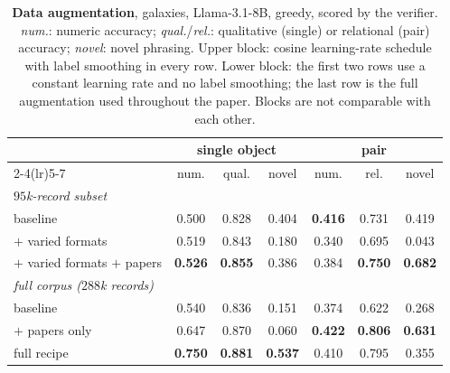 \begin{table}[h]\centering\small
\caption{\textbf{Data augmentation}, galaxies, Llama-3.1-8B, greedy, scored by the
verifier. \emph{num.}: numeric accuracy; \emph{qual.}/\emph{rel.}: qualitative
(single) or relational (pair) accuracy; \emph{novel}: novel phrasing. Upper
block: cosine learning-rate schedule with label smoothing in every row. Lower
block: the first two rows use a constant learning rate and no label smoothing;
the last row is the full augmentation used throughout the paper. Blocks are not
comparable with each other.}
\label{tab:recipe}
\begin{tabular}{lcccccc}
\toprule
 & \multicolumn{3}{c}{single object} & \multicolumn{3}{c}{pair} \\
\cmidrule(lr){2-4}\cmidrule(lr){5-7}
 & num. & qual. & novel & num. & rel. & novel \\
\midrule
\multicolumn{7}{l}{\emph{$95$k-record subset}}\\
baseline                         & 0.500 & 0.828 & 0.404 & \textbf{0.416} & 0.731 & 0.419 \\
$+$ varied formats               & 0.519 & 0.843 & 0.180 & 0.340 & 0.695 & 0.043 \\
$+$ varied formats $+$ papers    & \textbf{0.526} & \textbf{0.855} & 0.386 & 0.384 & \textbf{0.750} & \textbf{0.682} \\
\midrule
\multicolumn{7}{l}{\emph{full corpus ($288$k records)}}\\
baseline                         & 0.540 & 0.836 & 0.151 & 0.374 & 0.622 & 0.268 \\
$+$ papers only                  & 0.647 & 0.870 & 0.060 & \textbf{0.422} & \textbf{0.806} & \textbf{0.631} \\
full recipe                      & \textbf{0.750} & \textbf{0.881} & \textbf{0.537} & 0.410 & 0.795 & 0.355 \\
\bottomrule
\end{tabular}
\end{table}

